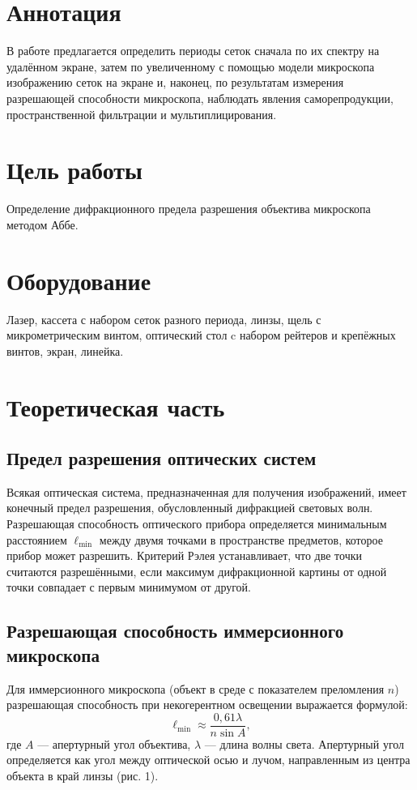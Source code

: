 \section*{Аннотация}
В работе предлагается определить периоды сеток сначала по их спектру на удалённом экране, затем по увеличенному с помощью модели микроскопа изображению сеток на экране и, наконец, по результатам измерения разрешающей способности микроскопа, наблюдать явления саморепродукции, пространственной фильтрации и мультиплицирования.

\section*{Цель работы}
Определение дифракционного предела разрешения объектива микроскопа методом Аббе.

\section*{Оборудование}
Лазер, кассета с набором сеток разного периода, линзы, щель с микрометрическим винтом, оптический стол c набором рейтеров и крепёжных винтов, экран, линейка.

\section*{Теоретическая часть}

\subsection*{Предел разрешения оптических систем}
Всякая оптическая система, предназначенная для получения изображений, имеет конечный предел разрешения, обусловленный дифракцией световых волн. Разрешающая способность оптического прибора определяется минимальным расстоянием \( \ell_{\min} \) между двумя точками в пространстве предметов, которое прибор может разрешить. Критерий Рэлея устанавливает, что две точки считаются разрешёнными, если максимум дифракционной картины от одной точки совпадает с первым минимумом от другой.

\subsection*{Разрешающая способность иммерсионного микроскопа}
Для иммерсионного микроскопа (объект в среде с показателем преломления \( n \)) разрешающая способность при некогерентном освещении выражается формулой:
\begin{equation}
    \ell_{\min} \approx \frac{0,61 \lambda}{n \sin A},
\end{equation}
где \( A \) --- апертурный угол объектива, \( \lambda \) --- длина волны света. Апертурный угол определяется как угол между оптической осью и лучом, направленным из центра объекта в край линзы (рис. 1).


